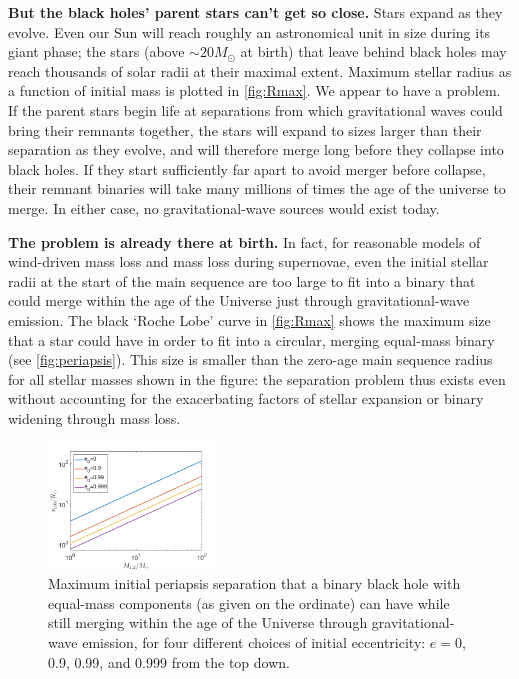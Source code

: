 \documentclass[iop,onecolumn]{revtex4}
\begin{document}
\textbf{But the black holes' parent stars can't get so close.} Stars expand as they evolve. Even our Sun will reach roughly an astronomical unit in size during its giant phase; the stars (above $\sim 20 M_\odot$  at birth) that leave behind black holes may reach thousands of solar radii at their maximal extent. Maximum stellar radius as a function of initial mass is plotted in \autoref{fig:Rmax}. We appear to have a problem. If the parent stars begin life at separations from which gravitational waves could bring their remnants together, the stars will expand to sizes larger than their separation as they evolve, and will therefore merge long before they collapse into black holes. If they start sufficiently far apart to avoid merger before collapse, their remnant binaries will take many millions of times the age of the universe to merge. In either case, no gravitational-wave sources would exist today. 

\textbf{The problem is already there at birth.} In fact, for reasonable models of wind-driven mass loss and mass loss during supernovae, even the initial stellar radii at the start of the main sequence are too large to fit into a binary that could merge within the age of the Universe just through gravitational-wave emission.  The black `Roche Lobe' curve in \autoref{fig:Rmax} shows the maximum size that a star could have in order to fit into a circular, merging equal-mass binary (see \autoref{fig:periapsis}).  This size is smaller than the zero-age main sequence radius for all stellar masses shown in the figure: the separation problem thus exists even without accounting for the exacerbating factors of stellar expansion or binary widening through mass loss.
 
\begin{figure}
	\centering
	\includegraphics[width=0.4\textwidth]{M-rp-log.png}
	\caption{Maximum initial periapsis separation that a binary black hole with equal-mass components (as given on the ordinate) can have while still merging within the age of the Universe through gravitational-wave emission, for four different choices of initial eccentricity: $e=0$, 0.9, 0.99, and 0.999 from the top down.\label{fig:periapsis}}
\end{figure}
	
\end{document}
